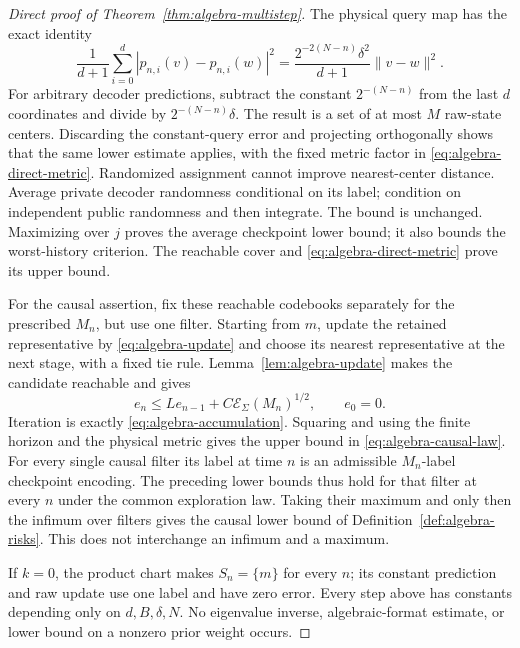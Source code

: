 \begin{proof}[Direct proof of Theorem~\ref{thm:algebra-multistep}]
The physical query map has the exact identity
\begin{equation}\label{eq:algebra-direct-metric}
 \frac1{d+1}\sum_{i=0}^d|p_{n,i}(v)-p_{n,i}(w)|^2
     =\frac{2^{-2(N-n)}\delta^2}{d+1}\|v-w\|^2.
\end{equation}
For arbitrary decoder predictions, subtract the constant $2^{-(N-n)}$
from the last $d$ coordinates and divide by $2^{-(N-n)}\delta$.
The result is a set of at most $M$ raw-state centers. Discarding the
constant-query error and projecting orthogonally shows that the same
lower estimate applies, with the fixed metric factor in
\eqref{eq:algebra-direct-metric}. Randomized assignment cannot improve
nearest-center distance. Average private decoder randomness conditional
on its label; condition on independent public randomness and then
integrate. The bound is unchanged. Maximizing over $j$ proves the
average checkpoint lower bound; it also bounds the worst-history
criterion. The reachable cover and
\eqref{eq:algebra-direct-metric} prove its upper bound.

For the causal assertion, fix these reachable codebooks separately for
the prescribed $M_n$, but use one filter. Starting from $m$, update the
retained representative by \eqref{eq:algebra-update} and choose its
nearest representative at the next stage, with a fixed tie rule.
Lemma~\ref{lem:algebra-update} makes the candidate reachable and gives
\[
 e_n\le Le_{n-1}+C\mathcal E_\Sigma(M_n)^{1/2},
                               \qquad e_0=0.
\]
Iteration is exactly \eqref{eq:algebra-accumulation}. Squaring and
using the finite horizon and the physical metric gives the upper bound
in \eqref{eq:algebra-causal-law}. For every single causal filter its
label at time $n$ is an admissible $M_n$-label checkpoint encoding.
The preceding lower bounds thus hold for that filter at every $n$
under the common exploration law. Taking their maximum and only then
the infimum over filters gives the causal lower bound of
Definition~\ref{def:algebra-risks}. This does not interchange an
infimum and a maximum.

If $k=0$, the product chart makes $S_n=\{m\}$ for every $n$;
its constant prediction and raw update use one label and have zero
error. Every step above has constants depending only on
$d,B,\delta,N$. No eigenvalue inverse, algebraic-format estimate, or
lower bound on a nonzero prior weight occurs.
\end{proof}
